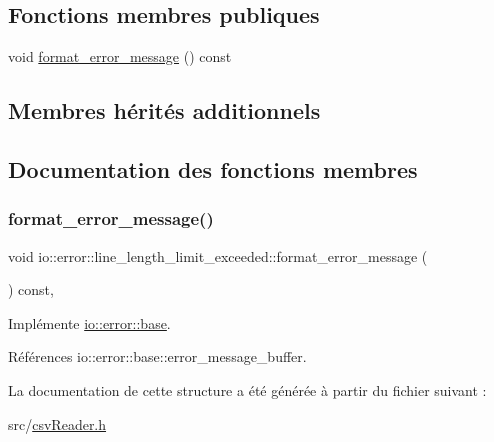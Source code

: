 \subsection*{Fonctions membres publiques}
\begin{DoxyCompactItemize}
\item 
void \hyperlink{structio_1_1error_1_1line__length__limit__exceeded_ae6ef1cf3ed1d82804953ac120892b85e}{format\+\_\+error\+\_\+message} () const
\end{DoxyCompactItemize}
\subsection*{Membres hérités additionnels}


\subsection{Documentation des fonctions membres}
\mbox{\label{structio_1_1error_1_1line__length__limit__exceeded_ae6ef1cf3ed1d82804953ac120892b85e}} 
\subsubsection{\texorpdfstring{format\+\_\+error\+\_\+message()}{format\_error\_message()}}
{\footnotesize\ttfamily void io\+::error\+::line\+\_\+length\+\_\+limit\+\_\+exceeded\+::format\+\_\+error\+\_\+message (\begin{DoxyParamCaption}{ }\end{DoxyParamCaption}) const\hspace{0.3cm}{\ttfamily [inline]}, {\ttfamily [virtual]}}



Implémente \hyperlink{structio_1_1error_1_1base_a7d9ff6a31b716a24f056cf8a3e15191d}{io\+::error\+::base}.



Références io\+::error\+::base\+::error\+\_\+message\+\_\+buffer.



La documentation de cette structure a été générée à partir du fichier suivant \+:\begin{DoxyCompactItemize}
\item 
src/\hyperlink{csvReader_8h}{csv\+Reader.\+h}\end{DoxyCompactItemize}
